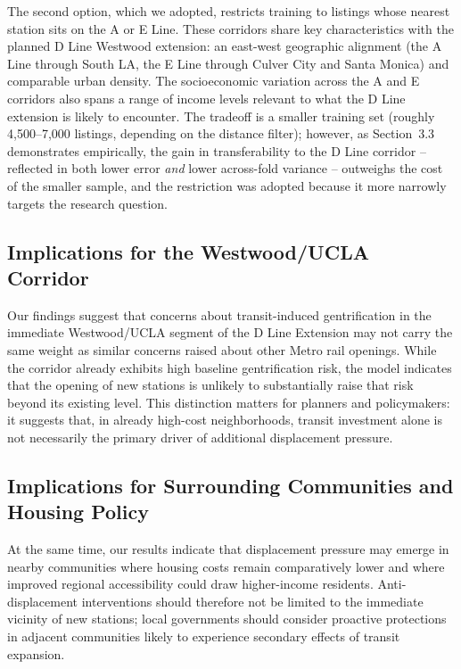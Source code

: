 \documentclass[11pt]{article}
\begin{document}
The second option, which we adopted, restricts training to listings whose nearest station sits on the A or E Line. These corridors share key characteristics with the planned D Line Westwood extension: an east-west geographic alignment (the A Line through South LA, the E Line through Culver City and Santa Monica) and comparable urban density. The socioeconomic variation across the A and E corridors also spans a range of income levels relevant to what the D Line extension is likely to encounter. The tradeoff is a smaller training set (roughly 4,500--7,000 listings, depending on the distance filter); however, as Section~3.3 demonstrates empirically, the gain in transferability to the D Line corridor -- reflected in both lower error \emph{and} lower across-fold variance -- outweighs the cost of the smaller sample, and the restriction was adopted because it more narrowly targets the research question.

\subsection{Implications for the Westwood/UCLA Corridor}

Our findings suggest that concerns about transit-induced gentrification in the immediate Westwood/UCLA segment of the D Line Extension may not carry the same weight as similar concerns raised about other Metro rail openings. While the corridor already exhibits high baseline gentrification risk, the model indicates that the opening of new stations is unlikely to substantially raise that risk beyond its existing level. This distinction matters for planners and policymakers: it suggests that, in already high-cost neighborhoods, transit investment alone is not necessarily the primary driver of additional displacement pressure.

\subsection{Implications for Surrounding Communities and Housing Policy}

At the same time, our results indicate that displacement pressure may emerge in nearby communities where housing costs remain comparatively lower and where improved regional accessibility could draw higher-income residents. Anti-displacement interventions should therefore not be limited to the immediate vicinity of new stations; local governments should consider proactive protections in adjacent communities likely to experience secondary effects of transit expansion.
\end{document}
